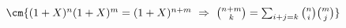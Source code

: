 		\paragraph{} ${}$ \\
		\hspace*{2cm} $\cm{(1+X)^n(1+X)^m = (1+X)^{n+m} ~\Rightarrow~ \binom{n+m}{k} = \sum_{i+j=k} \binom{n}{i}\binom{m}{j} } $ \vspace*{0.5cm} \\
		\begin{center}
			\fin
		\end{center}